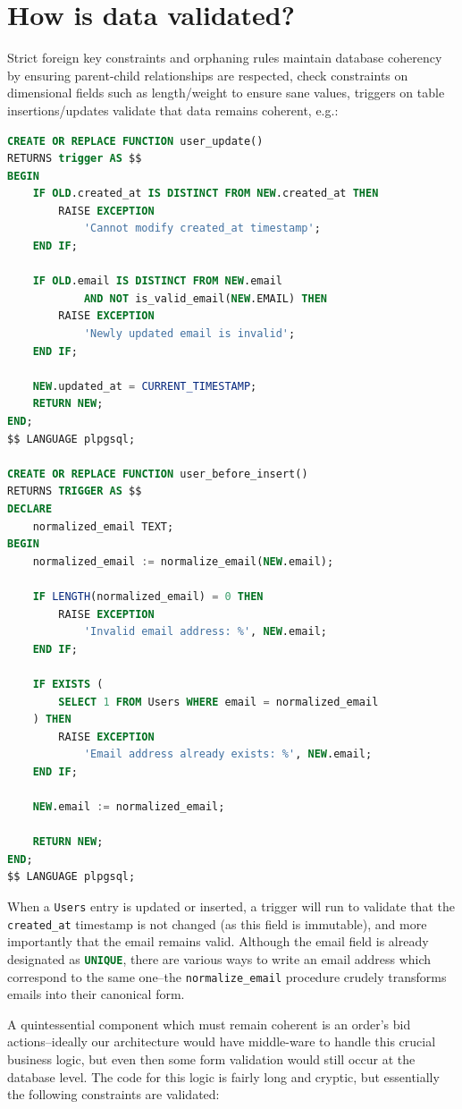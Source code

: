 \documentclass[journal]{classes/IEEEtran}
\begin{document}
	\section{How is data validated?}
	Strict foreign key constraints and orphaning rules maintain database coherency by ensuring parent-child relationships are respected, check constraints on dimensional fields such as length/weight to ensure sane values, triggers on table insertions/updates validate that data remains coherent, e.g.:
	
	\begin{lstlisting}[language=SQL]
CREATE OR REPLACE FUNCTION user_update()
RETURNS trigger AS $$
BEGIN
	IF OLD.created_at IS DISTINCT FROM NEW.created_at THEN
		RAISE EXCEPTION
			'Cannot modify created_at timestamp';
	END IF;
	
	IF OLD.email IS DISTINCT FROM NEW.email
			AND NOT is_valid_email(NEW.EMAIL) THEN
		RAISE EXCEPTION
			'Newly updated email is invalid';
	END IF;
	
	NEW.updated_at = CURRENT_TIMESTAMP;
	RETURN NEW;
END;
$$ LANGUAGE plpgsql;

CREATE OR REPLACE FUNCTION user_before_insert()
RETURNS TRIGGER AS $$
DECLARE
	normalized_email TEXT;
BEGIN
	normalized_email := normalize_email(NEW.email);
	
	IF LENGTH(normalized_email) = 0 THEN
		RAISE EXCEPTION
			'Invalid email address: %', NEW.email;
	END IF;
	
	IF EXISTS (
		SELECT 1 FROM Users WHERE email = normalized_email
	) THEN
		RAISE EXCEPTION
			'Email address already exists: %', NEW.email;
	END IF;
	
	NEW.email := normalized_email;
	
	RETURN NEW;
END;
$$ LANGUAGE plpgsql;
	\end{lstlisting}
	
	When a \texttt{Users} entry is updated or inserted, a trigger will run to validate that the \texttt{created\_at} timestamp is not changed (as this field is immutable), and more importantly that the email remains valid. Although the email field is already designated as \lstinline[language=SQL]|UNIQUE|, there are various ways to write an email address which correspond to the same one--the \lstinline|normalize_email| procedure crudely transforms emails into their canonical form.
	
	A quintessential component which must remain coherent is an order's bid actions--ideally our architecture would have middle-ware to handle this crucial business logic, but even then some form validation would still occur at the database level. The code for this logic is fairly long and cryptic, but essentially the following constraints are validated:
	
\end{document}
